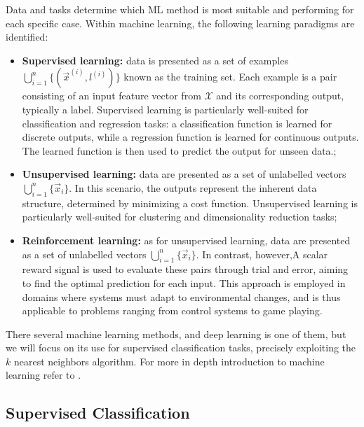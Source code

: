 \noindent Data and tasks determine which \acs{ML} method is most suitable and performing for each specific case. Within machine learning, the following learning paradigms are identified:
\begin{itemize}
	\item \textbf{Supervised learning:} data is presented as a set of examples $\bigcup_{i=1}^n\{(\vec{x}^{(i)}, l^{(i)})\}$ known as the training set. Each example is a pair consisting of an input feature vector from $\mathcal{X}$ and its corresponding output, typically a label. Supervised learning is particularly well-suited for classification and regression tasks: a classification function is learned for discrete outputs, while a regression function is learned for continuous outputs. The learned function is then used to predict the output for unseen data.;
	\item \textbf{Unsupervised learning:} data are presented as a set of unlabelled vectors $\bigcup_{i=1}^n\{\vec{x}_i\}$. In this scenario, the outputs represent the inherent data structure, determined by minimizing a cost function. Unsupervised learning is particularly well-suited for clustering and dimensionality reduction tasks;
	\item \textbf{Reinforcement learning:} as for unsupervised learning, data are presented as a set of unlabelled vectors $\bigcup_{i=1}^n\{\vec{x}_i\}$. In contrast, however,A scalar reward signal is used to evaluate these pairs through trial and error, aiming to find the optimal prediction for each input. This approach is employed in domains where systems must adapt to environmental changes, and is thus applicable to problems ranging from control systems to game playing.
\end{itemize}

There several machine learning methods, and deep learning is one of them, but we will focus on its use for supervised classification tasks, precisely exploiting the $k$ nearest neighbors algorithm. For more in depth introduction to machine learning refer to \cite{alpaydin2020introduction}.

\subsection{Supervised Classification}
\label{subsec:supervised-class}

